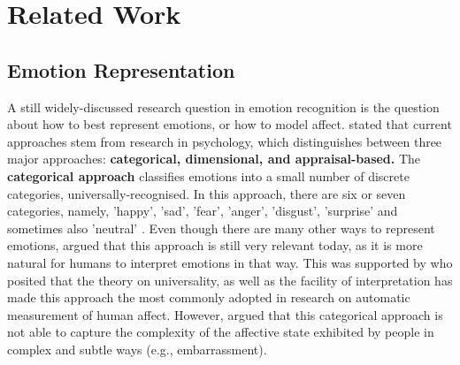 
\chapter{Related Work}

\section{Emotion Representation}
A still widely-discussed research question in emotion recognition is the question about how to best represent emotions, or how to model affect. \citet{Gunes:2011:EmotionRepresentationContinuous} stated that current approaches stem from research in psychology, which distinguishes between three major approaches: \textbf{categorical, dimensional, and appraisal-based.}
\newline\newline
The \textbf{categorical approach} classifies emotions into a small number of discrete categories, universally-recognised. In this approach, there are six or seven categories, namely, 'happy', 'sad', 'fear', 'anger', 'disgust', 'surprise' and sometimes also 'neutral' \citep{Hupont:2010:FacialEmotionsIn2DAffectiveSpace}. Even though there are many other ways to represent emotions, \citet{Salah:2018:VideoBasedER} argued that this approach is still very relevant today, as it is more natural for humans to interpret emotions in that way. This was supported by \citet{Gunes:2011:EmotionRepresentationContinuous} who posited that the theory on universality, as well as the facility of interpretation has made this approach the most commonly adopted in research on automatic measurement of human affect.
\newline\newline
However, \citet{Gunes:2011:EmotionRepresentationContinuous} argued that this categorical approach is not able to capture the complexity of the affective state exhibited by people in complex and subtle ways (e.g., embarrassment).
